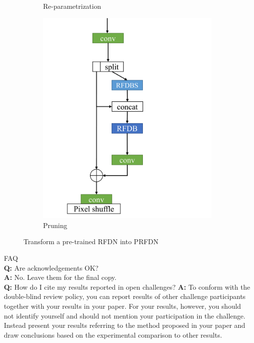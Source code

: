 \documentclass[10pt,twocolumn,letterpaper]{article}
\begin{document}
\begin{figure}
\begin{subfigure}[b]{0.49\linewidth}
        \caption{Re-parametrization}
        \label{fig:Re-parametrization}
    \end{subfigure}
    \begin{subfigure}[b]{0.49\linewidth}
		\centering
        \includegraphics[width=\textwidth]{../Pruning.pdf}
        \caption{Pruning}
        \label{fig:Pruning}
    \end{subfigure}
    \caption{Transform a pre-trained RFDN into PRFDN}
    \label{fig:PRFDN}
\end{figure}

\noindent
FAQ\medskip\\
{\bf Q:} Are acknowledgements OK?\\
{\bf A:} No.  Leave them for the final copy.\medskip\\
{\bf Q:} How do I cite my results reported in open challenges?
{\bf A:} To conform with the double-blind review policy, you can report results of other challenge participants together with your results in your paper.
For your results, however, you should not identify yourself and should not mention your participation in the challenge.
Instead present your results referring to the method proposed in your paper and draw conclusions based on the experimental comparison to other results.\medskip\\
\end{document}
